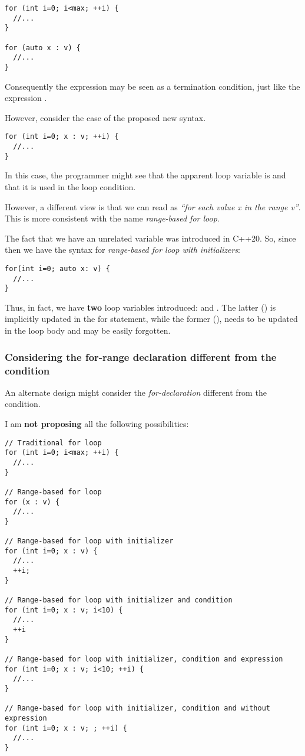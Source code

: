 \begin{lstlisting}
for (int i=0; i<max; ++i) {
  //...
}

for (auto x : v) {
  //...
}
\end{lstlisting}

Consequently the expression  may be seen as a termination
condition, just like the expression .

However, consider the case of the proposed new syntax.
\begin{lstlisting}
for (int i=0; x : v; ++i) {
  //...
}
\end{lstlisting} 

In this case, the programmer might see that the apparent loop variable is
 and that it is used in the loop condition.

However, a different view is that we can read  as
\emph{``for each value x in the range v''}. This is more consistent with the
name \emph{range-based for loop}.

The fact that we have an unrelated variable  was introduced in C++20. So,
since then we have the syntax for \emph{range-based for loop with initializers}:

\begin{lstlisting}
for(int i=0; auto x: v) {
  //...
}
\end{lstlisting}

Thus, in fact, we have \textbf{two} loop variables introduced:  and
. The latter () is implicitly updated in the for statement,
while the former (), needs to be updated in the loop body and may be
easily forgotten.
 
\subsubsection{Considering the for-range declaration different from the
condition}

An alternate design might consider the \emph{for-declaration} different from the
condition.

I am \textbf{not proposing} all 
the following possibilities:

\begin{lstlisting}
// Traditional for loop
for (int i=0; i<max; ++i) {
  //...
}

// Range-based for loop
for (x : v) {
  //...
}

// Range-based for loop with initializer
for (int i=0; x : v) {
  //...
  ++i;
}

// Range-based for loop with initializer and condition
for (int i=0; x : v; i<10) {
  //...
  ++i
}

// Range-based for loop with initializer, condition and expression
for (int i=0; x : v; i<10; ++i) {
  //...
}

// Range-based for loop with initializer, condition and without expression
for (int i=0; x : v; ; ++i) {
  //...
}
\end{lstlisting}

